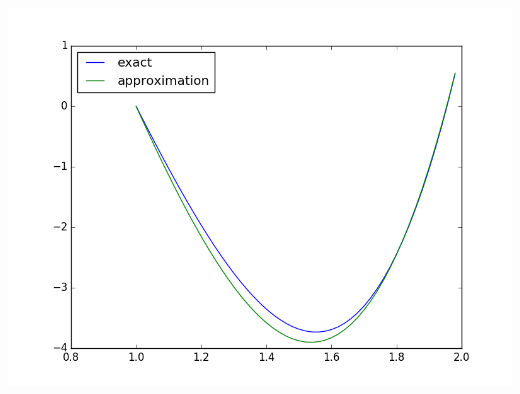 \documentclass[oneside, final, 12pt]{article}
\begin{document}
\begin{enumerate}
    \includegraphics[scale=0.5]{plot1.png}
\end{enumerate}


\end{document}
